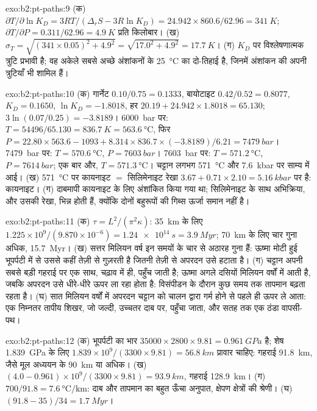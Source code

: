 \begin{solution}{exo:b2:pt-paths:9}
(क) $\partial T/\partial\ln K_D = 3RT/(\Delta_r S - 3R\ln K_D) = 24.942\times860.6/62.96 =
\qty{341}{K}$; $\partial T/\partial P = 0.311/62.96 = \qty{4.9}{K}$ प्रति किलोबार।
(ख) $\sigma_T = \sqrt{(341\times0.05)^2 + 4.9^2} = \sqrt{17.0^2 + 4.9^2} =
\qty{17.7}{K}$। (ग) $K_D$ पर विश्लेषणात्मक त्रुटि प्रभावी है; वह अकेले सबसे अच्छे अंशांकनों के
\qty{25}{\celsius} का दो-तिहाई है, जिनमें अंशांकन की अपनी त्रुटियाँ भी
शामिल हैं।
\end{solution}

\begin{solution}{exo:b2:pt-paths:10}
(क) गार्नेट $0.10/0.75 = 0.1333$, बायोटाइट $0.42/0.52 = 0.8077$, $K_D = 0.1650$, $\ln K_D =
-1.8018$, हर $20.19 + 24.942\times1.8018 = 65.130$; $3\ln(0.07/0.25) = -3.8189$।
\qty{6000}{bar} पर: $T = 54496/65.130 = \qty{836.7}{K} = \qty{563.6}{\celsius}$, फिर $P
= 22.80\times563.6 - 1093 + 8.314\times836.7\times(-3.8189)/6.21 = \qty{7479}{bar}$।
\qty{7479}{bar} पर: $T = \qty{570.6}{\celsius}$, $P = \qty{7603}{bar}$।
\qty{7603}{bar} पर: $T = \qty{571.2}{\celsius}$, $P = \qty{7614}{bar}$; एक बार और, $T =
\qty{571.3}{\celsius}$। चट्टान लगभग \qty{571}{\celsius} और
\qty{7.6}{kbar} पर साम्य में आई। (ख) \qty{571}{\celsius} पर कायनाइट $=$ सिलिमेनाइट रेखा $3.67
+ 0.71\times2.10 = \qty{5.16}{kbar}$ पर है: कायनाइट। (ग) दाबमापी
कायनाइट के लिए अंशांकित किया गया था; सिलिमेनाइट के साथ अभिक्रिया, और उसकी रेखा, भिन्न होती हैं, क्योंकि दोनों बहुरूपों की
गिब्स ऊर्जा समान नहीं है।
\end{solution}

\begin{solution}{exo:b2:pt-paths:11}
(क) $\tau = L^2/(\pi^2\kappa)$: \qty{35}{km} के लिए $1.225\times10^9/(9.870\times10^{-6}) =
\qty{1.24e14}{s} = \qty{3.9}{Myr}$; \qty{70}{km} के लिए चार गुना अधिक,
\qty{15.7}{Myr}। (ख) सत्तर मिलियन वर्ष इन समयों के चार से अठारह गुना हैं: ऊष्मा
मोटी हुई भूपर्पटी में से उससे कहीं तेज़ी से गुज़रती है जितनी तेज़ी से अपरदन उसे हटाता है। (ग) चट्टान
अपनी सबसे बड़ी गहराई पर एक साथ, चढ़ाव में ही, पहुँच जाती है; ऊष्मा अगले
दसियों मिलियन वर्षों में आती है, जबकि अपरदन उसे धीरे-धीरे ऊपर ला रहा होता है: विसंपीडन के दौरान
कुछ समय तक तापमान बढ़ता रहता है। (घ) सात मिलियन वर्षों में अपरदन
चट्टान को चालन द्वारा गर्म होने से पहले ही ऊपर ले आता: एक निम्नतर तापीय शिखर, जो
जल्दी, उच्चतर दाब पर, पहुँचा जाता, और सतह तक एक ठंडा वापसी-पथ।
\end{solution}

\begin{solution}{exo:b2:pt-paths:12}
(क) भूपर्पटी का भार $35000\times2800\times9.81 = \qty{0.961}{GPa}$ है; शेष
\qty{1.839}{GPa} के लिए $1.839\times10^9/(3300\times9.81) = \qty{56.8}{km}$ प्रावार चाहिए: गहराई
\qty{91.8}{km}, जैसे मूल अध्ययन के \qty{90}{km} या अधिक। (ख) $(4.0 -
0.961)\times10^9/(3300\times9.81) = \qty{93.9}{km}$, गहराई \qty{128.9}{km}।
(ग) $700/91.8 = \qty{7.6}{\celsius\per\km}$: दाब और तापमान का बहुत ऊँचा
अनुपात, क्षेपण क्षेत्रों की श्रेणी। (घ) $(91.8 - 35)/34 = \qty{1.7}{Myr}$।
\end{solution}

